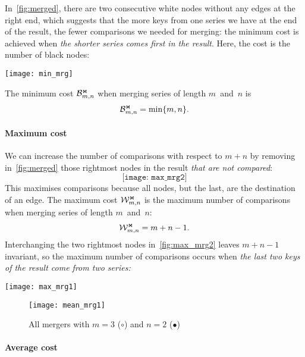 In~\eqref{fig:merged}, there are two consecutive white nodes without
any edges at the right end, which suggests that the more keys from one
series we have at the end of the result, the fewer comparisons we
needed for merging: the minimum cost is achieved when \emph{the
  shorter series comes first in the result}. Here, the cost is the
number of black nodes:
\begin{center}
\texttt{[image: min\_mrg]}
\end{center}
The minimum cost \(\mathcal{B}_{m,n}^{\Join}\) when
merging series of length \(m\)~and~\(n\) is
\begin{equation}
\mathcal{B}_{m,n}^{\Join} = \min\{m,n\}.\label{eq:best_merge}
\end{equation}


\paragraph{Maximum cost}

We can increase the number of comparisons with respect
to \(m+n\) by removing in~\eqref{fig:merged} those rightmost
nodes in the result \emph{that are not compared}:
\begin{equation}
\texttt{[image: max\_mrg2]}
\label{fig:max_mrg2}
\end{equation}
This maximises comparisons because all nodes, but the last, are the
destination of an edge. The maximum cost \(\mathcal{W}_{m,n}^{\Join}\) is the
maximum number of comparisons when merging series of length \(m\)~and~\(n\):
\begin{equation}
\mathcal{W}_{m,n}^{\Join} = m + n - 1.\label{eq:worst_merge}
\end{equation}
Interchanging the two rightmost nodes in~\eqref{fig:max_mrg2} leaves \(m+n-1\) invariant, so the maximum number of comparisons occurs when \emph{the last two
  keys of the result come from two series:}
\begin{center}
\texttt{[image: max\_mrg1]}
\end{center}

\begin{figure}
\centering
\texttt{[image: mean\_mrg1]}
\caption{All mergers with \(m=3\) (\(\circ\)) and \(n=2\)
  (\(\bullet\))
\label{fig:mean_mrg1}}
\end{figure}

\paragraph{Average cost}

